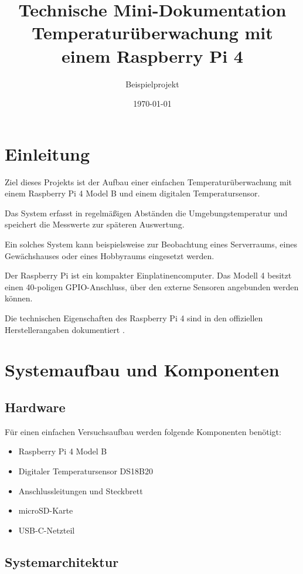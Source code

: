 \documentclass[a4paper,11pt]{article}
\title{
    \textbf{Technische Mini-Dokumentation}\\
    \large Temperaturüberwachung mit einem Raspberry Pi 4
}
\author{Beispielprojekt}
\date{\today}
\begin{document}
\maketitle

\section{Einleitung}

Ziel dieses Projekts ist der Aufbau einer einfachen
Temperaturüberwachung mit einem Raspberry Pi 4 Model B
und einem digitalen Temperatursensor.

Das System erfasst in regelmäßigen Abständen die
Umgebungstemperatur und speichert die Messwerte zur
späteren Auswertung.

Ein solches System kann beispielsweise zur Beobachtung
eines Serverraums, eines Gewächshauses oder eines
Hobbyraums eingesetzt werden.

Der Raspberry Pi ist ein kompakter Einplatinencomputer.
Das Modell 4 besitzt einen 40-poligen GPIO-Anschluss,
über den externe Sensoren angebunden werden können.

Die technischen Eigenschaften des Raspberry Pi 4
sind in den offiziellen Herstellerangaben dokumentiert
\cite{raspberrypi4}.

\section{Systemaufbau und Komponenten}

\subsection{Hardware}

Für einen einfachen Versuchsaufbau werden folgende
Komponenten benötigt:

\begin{itemize}
    \item Raspberry Pi 4 Model B
    \item Digitaler Temperatursensor DS18B20
    \item Anschlussleitungen und Steckbrett
    \item microSD-Karte
    \item USB-C-Netzteil
\end{itemize}

\subsection{Systemarchitektur}
\end{document}
